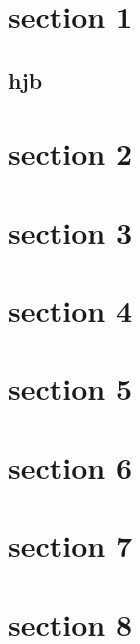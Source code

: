 \documentclass{beamer}
\begin{document}
{
\begin{frame}
\titlepage
\end{frame}
}


\section{section 1}
\subsection{hjb}
\begin{frame}
\end{frame}

\section{section 2}
\frame{}
\section{section 3}
\frame{}
\section{section 4}
\frame{}
\section{section 5}
\frame{}
\section{section 6}
\frame{}
\section{section 7}
\frame{}
\section{section 8}
\frame{}
\end{document}
